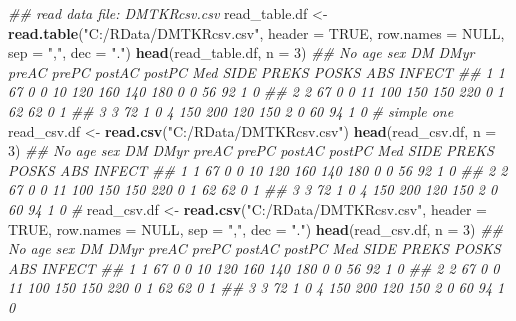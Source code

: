 \documentclass[
]{book}
\newenvironment{Shaded}{\begin{snugshade}}{\end{snugshade}}
\newcommand{\CommentTok}[1]{\textcolor[rgb]{0.56,0.35,0.01}{\textit{#1}}}
\newcommand{\DataTypeTok}[1]{\textcolor[rgb]{0.13,0.29,0.53}{#1}}
\newcommand{\DecValTok}[1]{\textcolor[rgb]{0.00,0.00,0.81}{#1}}
\newcommand{\KeywordTok}[1]{\textcolor[rgb]{0.13,0.29,0.53}{\textbf{#1}}}
\newcommand{\NormalTok}[1]{#1}
\newcommand{\OtherTok}[1]{\textcolor[rgb]{0.56,0.35,0.01}{#1}}
\newcommand{\StringTok}[1]{\textcolor[rgb]{0.31,0.60,0.02}{#1}}
\begin{document}
\begin{Shaded}
\begin{Highlighting}[]
\CommentTok{\#\# read data file: DMTKRcsv.csv}
\NormalTok{read\_table.df \textless{}{-}}\StringTok{ }\KeywordTok{read.table}\NormalTok{(}\StringTok{"C:/RData/DMTKRcsv.csv"}\NormalTok{,}
                            \DataTypeTok{header =} \OtherTok{TRUE}\NormalTok{,}
                            \DataTypeTok{row.names =} \OtherTok{NULL}\NormalTok{,}
                            \DataTypeTok{sep =} \StringTok{","}\NormalTok{,}
                            \DataTypeTok{dec =} \StringTok{"."}\NormalTok{)}
\KeywordTok{head}\NormalTok{(read\_table.df, }\DataTypeTok{n =} \DecValTok{3}\NormalTok{)}
\CommentTok{\#\#   No age sex DM DMyr preAC prePC postAC postPC Med SIDE PREKS POSKS ABS INFECT}
\CommentTok{\#\# 1  1  67   0  0   10   120   160    140    180   0    0    56    92   1      0}
\CommentTok{\#\# 2  2  67   0  0   11   100   150    150    220   0    1    62    62   0      1}
\CommentTok{\#\# 3  3  72   1  0    4   150   200    120    150   2    0    60    94   1      0}
\CommentTok{\# simple one}
\NormalTok{read\_csv.df \textless{}{-}}\StringTok{ }\KeywordTok{read.csv}\NormalTok{(}\StringTok{"C:/RData/DMTKRcsv.csv"}\NormalTok{)}
\KeywordTok{head}\NormalTok{(read\_csv.df, }\DataTypeTok{n =} \DecValTok{3}\NormalTok{)}
\CommentTok{\#\#   No age sex DM DMyr preAC prePC postAC postPC Med SIDE PREKS POSKS ABS INFECT}
\CommentTok{\#\# 1  1  67   0  0   10   120   160    140    180   0    0    56    92   1      0}
\CommentTok{\#\# 2  2  67   0  0   11   100   150    150    220   0    1    62    62   0      1}
\CommentTok{\#\# 3  3  72   1  0    4   150   200    120    150   2    0    60    94   1      0}
\CommentTok{\#}
\NormalTok{read\_csv.df \textless{}{-}}\StringTok{ }\KeywordTok{read.csv}\NormalTok{(}\StringTok{"C:/RData/DMTKRcsv.csv"}\NormalTok{,}
                            \DataTypeTok{header =} \OtherTok{TRUE}\NormalTok{,}
                            \DataTypeTok{row.names =} \OtherTok{NULL}\NormalTok{,}
                            \DataTypeTok{sep =} \StringTok{","}\NormalTok{,}
                            \DataTypeTok{dec =} \StringTok{"."}\NormalTok{)}
\KeywordTok{head}\NormalTok{(read\_csv.df, }\DataTypeTok{n =} \DecValTok{3}\NormalTok{)}
\CommentTok{\#\#   No age sex DM DMyr preAC prePC postAC postPC Med SIDE PREKS POSKS ABS INFECT}
\CommentTok{\#\# 1  1  67   0  0   10   120   160    140    180   0    0    56    92   1      0}
\CommentTok{\#\# 2  2  67   0  0   11   100   150    150    220   0    1    62    62   0      1}
\CommentTok{\#\# 3  3  72   1  0    4   150   200    120    150   2    0    60    94   1      0}
\end{Highlighting}
\end{Shaded}
\end{document}
